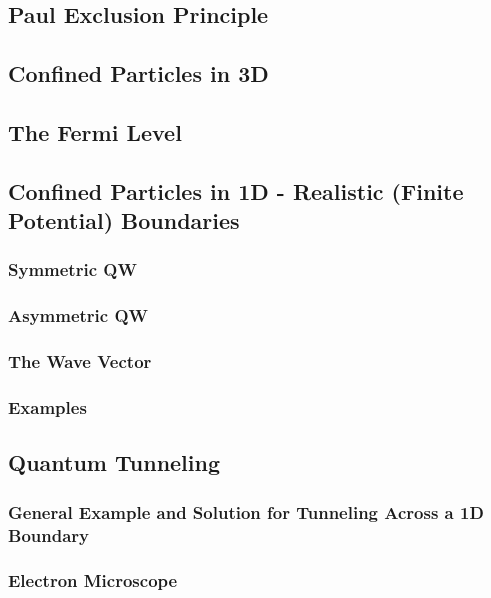 \documentclass[colorlinks,11pt,a4paper,normalphoto,withhyper,ragged2e]{altareport}
\begin{document}
	
	\subsection{Paul Exclusion Principle}
	
	
	\subsection{Confined Particles in 3D}
	
	
	\subsection{The Fermi Level}
	
	
	\subsection{Confined Particles in 1D - Realistic (Finite Potential) Boundaries}
	
		\subsubsection{Symmetric QW}
		
		
		\subsubsection{Asymmetric QW}
		
		
		\subsubsection{The Wave Vector}
		
		
		\subsubsection{Examples}
		
		
	\subsection{Quantum Tunneling}
	
		\subsubsection{General Example and Solution for Tunneling Across a 1D Boundary}
		
		
		\subsubsection{Electron Microscope}
		
\end{document}
